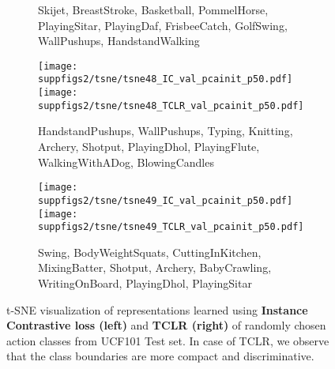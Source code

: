 \documentclass[10pt,twocolumn,letterpaper]{article}
\begin{document}
\begin{figure*}[h!]
\begin{subfigure}[t]{0.49\textwidth}
    \caption{\textcolor{c0}{Skijet}, \textcolor{c1}{BreastStroke}, \textcolor{c2}{Basketball}, \textcolor{c3}{PommelHorse}, \textcolor{c4}{PlayingSitar}, \textcolor{c5}{PlayingDaf}, \textcolor{c6}{FrisbeeCatch}, \textcolor{c7}{GolfSwing}, \textcolor{c8}{WallPushups}, \textcolor{c9}{HandstandWalking}}
\end{subfigure}
\begin{subfigure}[t]{0.49\textwidth}
    \texttt{[image: suppfigs2/tsne/tsne48\_IC\_val\_pcainit\_p50.pdf]}
    \texttt{[image: suppfigs2/tsne/tsne48\_TCLR\_val\_pcainit\_p50.pdf]}
    \caption{\textcolor{c0}{HandstandPushups}, \textcolor{c1}{WallPushups}, \textcolor{c2}{Typing}, \textcolor{c3}{Knitting}, \textcolor{c4}{Archery}, \textcolor{c5}{Shotput}, \textcolor{c6}{PlayingDhol}, \textcolor{c7}{PlayingFlute}, \textcolor{c8}{WalkingWithADog}, \textcolor{c9}{BlowingCandles}}
\end{subfigure}
\hfill \begin{subfigure}[t]{0.49\textwidth}
    \texttt{[image: suppfigs2/tsne/tsne49\_IC\_val\_pcainit\_p50.pdf]}
    \texttt{[image: suppfigs2/tsne/tsne49\_TCLR\_val\_pcainit\_p50.pdf]}
    \caption{\textcolor{c0}{Swing}, \textcolor{c1}{BodyWeightSquats}, \textcolor{c2}{CuttingInKitchen}, \textcolor{c3}{MixingBatter}, \textcolor{c4}{Shotput}, \textcolor{c5}{Archery}, \textcolor{c6}{BabyCrawling}, \textcolor{c7}{WritingOnBoard}, \textcolor{c8}{PlayingDhol}, \textcolor{c9}{PlayingSitar}}
\end{subfigure}
\vspace{-3mm}
\caption{t-SNE visualization of representations learned using \textbf{Instance Contrastive loss (left)} and  \textbf{TCLR (right)} of  randomly chosen action classes from UCF101 Test set. In case of TCLR, we observe that the class boundaries are more compact and discriminative.}
\label{fig:tsne}
\vspace{-3mm}
\end{figure*}










		
 
		
		
		
		
	
\end{document}
